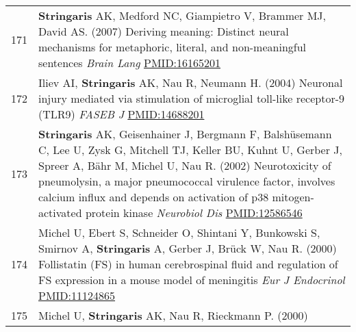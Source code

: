 \documentclass[
]{article}
\begin{document}
\begin{longtable}[]{@{}ll@{}}
\begin{minipage}[t]{0.01\columnwidth}\raggedright
171\strut
\end{minipage} & \begin{minipage}[t]{0.94\columnwidth}\raggedright
\textbf{Stringaris} AK, Medford NC, Giampietro V, Brammer MJ, David AS.
(2007) Deriving meaning: Distinct neural mechanisms for metaphoric,
literal, and non-meaningful sentences \emph{Brain Lang}
\url{PMID:16165201}\strut
\end{minipage}\tabularnewline
\begin{minipage}[t]{0.01\columnwidth}\raggedright
172\strut
\end{minipage} & \begin{minipage}[t]{0.94\columnwidth}\raggedright
Iliev AI, \textbf{Stringaris} AK, Nau R, Neumann H. (2004) Neuronal
injury mediated via stimulation of microglial toll-like receptor-9
(TLR9) \emph{FASEB J} \url{PMID:14688201}\strut
\end{minipage}\tabularnewline
\begin{minipage}[t]{0.01\columnwidth}\raggedright
173\strut
\end{minipage} & \begin{minipage}[t]{0.94\columnwidth}\raggedright
\textbf{Stringaris} AK, Geisenhainer J, Bergmann F, Balshüsemann C, Lee
U, Zysk G, Mitchell TJ, Keller BU, Kuhnt U, Gerber J, Spreer A, Bähr M,
Michel U, Nau R. (2002) Neurotoxicity of pneumolysin, a major
pneumococcal virulence factor, involves calcium influx and depends on
activation of p38 mitogen-activated protein kinase \emph{Neurobiol Dis}
\url{PMID:12586546}\strut
\end{minipage}\tabularnewline
\begin{minipage}[t]{0.01\columnwidth}\raggedright
174\strut
\end{minipage} & \begin{minipage}[t]{0.94\columnwidth}\raggedright
Michel U, Ebert S, Schneider O, Shintani Y, Bunkowski S, Smirnov A,
\textbf{Stringaris} A, Gerber J, Brück W, Nau R. (2000) Follistatin (FS)
in human cerebrospinal fluid and regulation of FS expression in a mouse
model of meningitis \emph{Eur J Endocrinol} \url{PMID:11124865}\strut
\end{minipage}\tabularnewline
\begin{minipage}[t]{0.01\columnwidth}\raggedright
175\strut
\end{minipage} & \begin{minipage}[t]{0.94\columnwidth}\raggedright
Michel U, \textbf{Stringaris} AK, Nau R, Rieckmann P. (2000)

\end{minipage}
\end{longtable}
\end{document}
